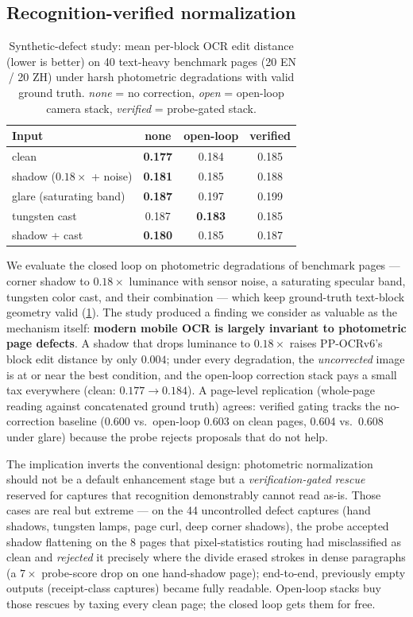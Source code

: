 \subsection{Recognition-verified normalization}
\label{sec:verified_exp}

\begin{table}[t]
\centering
\caption{Synthetic-defect study: mean per-block OCR edit distance (lower is better) on 40 text-heavy benchmark pages (20 EN / 20 ZH) under harsh photometric degradations with valid ground truth. \emph{none} = no correction, \emph{open} = open-loop camera stack, \emph{verified} = probe-gated stack.}
\label{tab:verified}
\small
\begin{tabular}{lccc}
\toprule
Input & none & open-loop & verified \\
\midrule
clean & \textbf{0.177} & 0.184 & 0.185 \\
shadow ($0.18\times$ + noise) & \textbf{0.181} & 0.185 & 0.188 \\
glare (saturating band) & \textbf{0.187} & 0.197 & 0.199 \\
tungsten cast & 0.187 & \textbf{0.183} & 0.185 \\
shadow + cast & \textbf{0.180} & 0.185 & 0.187 \\
\bottomrule
\end{tabular}
\end{table}

We evaluate the closed loop on photometric degradations of benchmark pages --- corner shadow to $0.18\times$ luminance with sensor noise, a saturating specular band, tungsten color cast, and their combination --- which keep ground-truth text-block geometry valid (\cref{tab:verified}). The study produced a finding we consider as valuable as the mechanism itself: \textbf{modern mobile OCR is largely invariant to photometric page defects}. A shadow that drops luminance to $0.18\times$ raises PP-OCRv6's block edit distance by only $0.004$; under every degradation, the \emph{uncorrected} image is at or near the best condition, and the open-loop correction stack pays a small tax everywhere (clean: $0.177 \rightarrow 0.184$). A page-level replication (whole-page reading against concatenated ground truth) agrees: verified gating tracks the no-correction baseline (0.600 vs.\ open-loop 0.603 on clean pages, 0.604 vs.\ 0.608 under glare) because the probe rejects proposals that do not help.

The implication inverts the conventional design: photometric normalization should not be a default enhancement stage but a \emph{verification-gated rescue} reserved for captures that recognition demonstrably cannot read as-is. Those cases are real but extreme --- on the 44 uncontrolled defect captures (hand shadows, tungsten lamps, page curl, deep corner shadows), the probe accepted shadow flattening on the 8 pages that pixel-statistics routing had misclassified as clean and \emph{rejected} it precisely where the divide erased strokes in dense paragraphs (a $7\times$ probe-score drop on one hand-shadow page); end-to-end, previously empty outputs (receipt-class captures) became fully readable. Open-loop stacks buy those rescues by taxing every clean page; the closed loop gets them for free.


